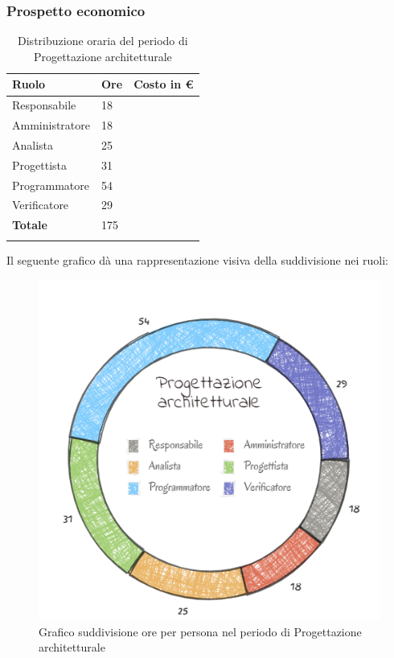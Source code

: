 \subsubsection{Prospetto economico}
\begin{longtable}{| C{.30\textwidth}| C{.15\textwidth}| C{.20\textwidth}|}
\hline
\textbf{Ruolo} & \textbf{Ore} & \textbf{Costo in \euro} \\
\hline 
Responsabile & 18 &  \\
\hline
Amministratore & 18 & \\
\hline
Analista & 25 &  \\
\hline
Progettista & 31 &  \\
\hline
Programmatore & 54 &  \\
\hline
Verificatore & 29 &  \\
\hline
\textbf{Totale} & 175 & \\ 
\hline

\caption{Distribuzione oraria del periodo di Progettazione architetturale}
\label{Distribuzione oraria del periodo di Progettazione architetturale}
\end{longtable}

Il seguente grafico dà una rappresentazione visiva della suddivisione nei ruoli:
\begin{figure}[H]
	\centering
  		\includegraphics[width=0.8\linewidth]{./images/torta_pa.png}
  		\caption{Grafico suddivisione ore per persona nel periodo di Progettazione architetturale}
  		\label{fig:grafico suddivione ruoli periodo di Progettazione architetturale}
\end{figure}


